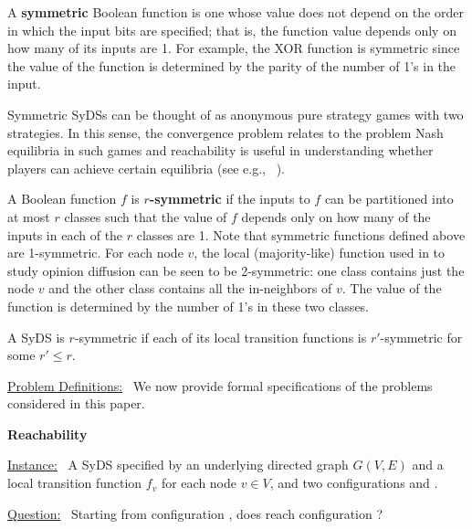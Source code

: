 A \textbf{symmetric} Boolean function is one whose
value does not depend on the order in
which the input bits are specified;
that is, the function value depends only on how many
of its inputs are 1.
For example, the XOR function is symmetric since the 
value of the function is determined by the parity of the number 
of 1's in the input.

Symmetric SyDSs
can be thought of as anonymous pure strategy
games with two strategies.  In this sense, the convergence
problem relates to the problem Nash equilibria in such games and
reachability is useful in understanding whether players can achieve
certain equilibria (see e.g.,
~\cite{blonski1999anonymous,daskalakis2007computing,daskalakis2015approximate,jackson2010social}).

A Boolean function $f$ is \textbf{$r$-symmetric}
if the inputs to $f$ can be partitioned into at most $r$ classes
such that the value of $f$ depends only on how many of the
inputs in each of the $r$ classes are 1.
Note that symmetric functions defined above are 1-symmetric.
For each node $v$, the local (majority-like) function 
used in \cite{Chistikov-etal-2020}
to study opinion diffusion can be seen to be 2-symmetric:
one class contains just the node $v$ and the other class
contains all the in-neighbors of $v$.
The value of the function is determined by the number
of 1's in these two classes.

A SyDS is $r$-symmetric
if each of its local transition
functions is $r'$-symmetric for some $r' \leq r$.

\smallskip
\noindent
\underline{\textsf{Problem Definitions:}}~ We now provide
formal specifications of the problems considered in this paper.

\smallskip
\noindent
\textbf{Reachability} %

\smallskip
\noindent
\underline{\textsf{Instance:}}~ A SyDS \cals{} specified 
by an underlying directed
graph $G(V,E)$ and a local transition function $f_v$ for each node $v \in V$,
and two configurations \calc{} and \cald{}. 

\noindent
\underline{\textsf{Question:}}~ Starting from configuration \calc,
does \cals{} reach configuration \cald? 

\iffalse
We observe that \textsc{Reach} is solvable in polynomial time for
any class of SyDSs for which function evaluation can be done in
polynomial time and there is a polynomial bound on the length of a
phase space cycle and the length of a transient.  In such a case,
the given SyDS can be simulated for the required number of steps.
As will be seen, this approach is applicable to NCFs, monotone
functions (with both positive and negative monotone functions allowed
in \cals{}), and bithreshold functions.
\fi

